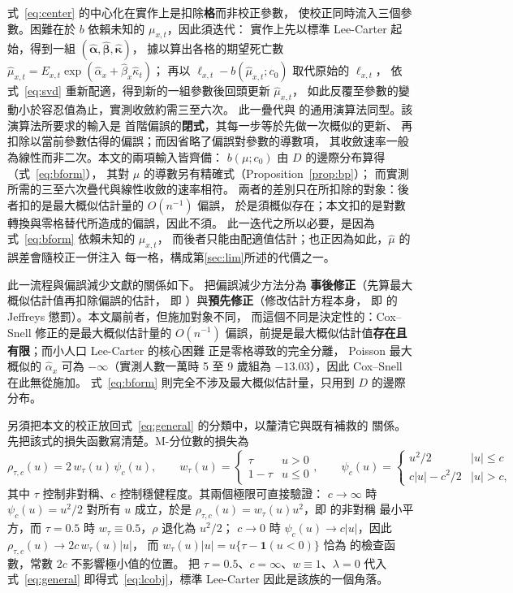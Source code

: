 \documentclass[UTF8, fontset=macnew, a4paper, 12pt]{ctexart}
\begin{document}
式~\eqref{eq:center} 的中心化在實作上是扣除\textbf{格}而非校正參數，
使校正同時流入三個參數。困難在於 $b$ 依賴未知的 $\mu_{x,t}$，因此須迭代：
實作上先以標準 Lee-Carter 起始，得到一組
$(\hat{\boldsymbol\alpha},\hat{\boldsymbol\beta},\hat{\boldsymbol\kappa})$，
據以算出各格的期望死亡數
$\hat\mu_{x,t}=E_{x,t}\exp(\hat\alpha_x+\hat\beta_x\hat\kappa_t)$；
再以 $\ell_{x,t}-b(\hat\mu_{x,t};c_0)$ 取代原始的 $\ell_{x,t}$，
依式~\eqref{eq:svd} 重新配適，得到新的一組參數後回頭更新 $\hat\mu_{x,t}$，
如此反覆至參數的變動小於容忍值為止，實測收斂約需三至六次。
此一疊代與 \citet{kosmidis2010} 的通用演算法同型。該演算法所要求的輸入是
首階偏誤的\textbf{閉式}，其每一步等於先做一次概似的更新、
再扣除以當前參數估得的偏誤；而因省略了偏誤對參數的導數項，
其收斂速率一般為線性而非二次。本文的兩項輸入皆齊備：
$b(\mu;c_0)$ 由 $D$ 的邊際分布算得（式~\eqref{eq:bform}），
其對 $\mu$ 的導數另有精確式（Proposition~\ref{prop:bp}）；
而實測所需的三至六次疊代與線性收斂的速率相符。
兩者的差別只在所扣除的對象：後者扣的是最大概似估計量的 $O(n^{-1})$ 偏誤，
於是須概似存在；本文扣的是對數轉換與零格替代所造成的偏誤，因此不須。
此一迭代之所以必要，是因為式~\eqref{eq:bform} 依賴未知的 $\mu_{x,t}$，
而後者只能由配適值估計；也正因為如此，$\hat\mu$ 的誤差會隨校正一併注入
每一格，構成第\ref{sec:lim}所述的代價之一。

此一流程與偏誤減少文獻的關係如下。\citet{firth1993} 把偏誤減少方法分為
\textbf{事後修正}（先算最大概似估計值再扣除偏誤的估計，
即 \citealp{coxsnell1968}）與\textbf{預先修正}（修改估計方程本身，
即 \citealp{firth1993} 的 Jeffreys 懲罰）。本文屬前者，但施加對象不同，
而這個不同是決定性的：Cox--Snell 修正的是最大概似估計量的 $O(n^{-1})$
偏誤，前提是最大概似估計值\textbf{存在且有限}；而小人口 Lee-Carter 的核心困難
正是零格導致的完全分離\citep{albert1984}，
Poisson 最大概似的 $\hat\alpha_x$ 可為 $-\infty$（實測人數一萬時
5 至 9 歲組為 $-13.03$），因此 Cox--Snell 在此無從施加。
式~\eqref{eq:bform} 則完全不涉及最大概似估計量，只用到 $D$ 的邊際分布。


另須把本文的校正放回式~\eqref{eq:general} 的分類中，以釐清它與既有補救的
關係。先把該式的損失函數寫清楚。M-分位數的損失為
\begin{equation}\label{eq:mq}
\rho_{\tau,c}(u)=2\,w_\tau(u)\,\psi_c(u),\qquad
w_\tau(u)=\begin{cases}\tau & u>0\\ 1-\tau & u\le 0\end{cases},\qquad
\psi_c(u)=\begin{cases}u^2/2 & |u|\le c\\ c|u|-c^2/2 & |u|>c,\end{cases}
\end{equation}
其中 $\tau$ 控制非對稱、$c$ 控制穩健程度。其兩個極限可直接驗證：
$c\to\infty$ 時 $\psi_c(u)=u^2/2$ 對所有 $u$ 成立，於是
$\rho_{\tau,c}(u)=w_\tau(u)u^2$，即 \citet{newey1987}的非對稱
最小平方，而 $\tau=0.5$ 時 $w_\tau\equiv0.5$，$\rho$ 退化為 $u^2/2$；
$c\to0$ 時 $\psi_c(u)\to c|u|$，因此 $\rho_{\tau,c}(u)\to 2c\,w_\tau(u)|u|$，
而 $w_\tau(u)|u|=u\{\tau-\mathbf{1}(u<0)\}$ 恰為 \citet{koenker1978}
的檢查函數，常數 $2c$ 不影響極小值的位置。
把 $\tau=0.5$、$c=\infty$、$w\equiv1$、$\lambda=0$ 代入式~\eqref{eq:general}
即得式~\eqref{eq:lcobj}，標準 Lee-Carter 因此是該族的一個角落。
\end{document}
